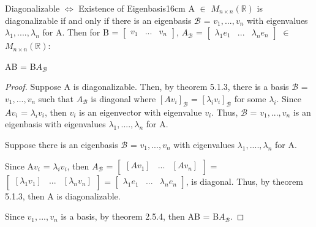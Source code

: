    \vspace{0.5cm}



    \begin{wtheorem}{Diagonalizable $\Leftrightarrow$ Existence of Eigenbasis}{16cm}
        A $\in$ $M_{n \times n}(\mathbb{R})$ is diagonalizable if and only if
        there is an eigenbasis $\mathcal{B}$ = $v_1,...,v_n$ with eigenvalues
        $\lambda_1,....,\lambda_n$ for A.
        Then for B =
        $\begin{bmatrix}
            v_1 & ... & v_n
        \end{bmatrix}$,
        $A_{\mathcal{B}}$ =
        $\begin{bmatrix}
            \lambda_1e_1 & ... & \lambda_ne_n
        \end{bmatrix}$
        $\in$ $M_{n \times n}(\mathbb{R})$:

        \hspace{0.5cm}
        AB = B$A_{\mathcal{B}}$
    \end{wtheorem}

    \begin{proof}
        Suppose A is diagonalizable. Then, by {\color{red} theorem 5.1.3},
        there is a basis $\mathcal{B}$ = $v_1,...,v_n$
        such that $A_{\mathcal{B}}$ is diagonal where
        $[Av_i]_{\mathcal{B}}$ = $[\lambda_i v_i]_{\mathcal{B}}$
        for some $\lambda_i$.
        Since $Av_i$ = $\lambda_i v_i$,
        then $v_i$ is an eigenvector with eigenvalue $v_i$.
        Thus, $\mathcal{B}$ = $v_1,...,v_n$ is an eigenbasis
        with eigenvalues $\lambda_1,....,\lambda_n$ for A.

        \vspace{0.3cm}

        Suppose there is an eigenbasis $\mathcal{B}$ = $v_1,...,v_n$ with
        eigenvalues $\lambda_1,....,\lambda_n$ for A.

        Since A$v_i$ = $\lambda_i v_i$,
        then $A_{\mathcal{B}}$ =
        $\begin{bmatrix}
            [Av_1]_{\mathcal{}} & ... & [Av_n]_{\mathcal{}}
        \end{bmatrix}$ =
        $\begin{bmatrix}
            [\lambda_1v_1]_{\mathcal{}} & ... & [\lambda_nv_n]_{\mathcal{}}
        \end{bmatrix}$ =
        $\begin{bmatrix}
            \lambda_1e_1 & ... & \lambda_ne_n
        \end{bmatrix}$,
        is diagonal.
        Thus, by {\color{red} theorem 5.1.3}, then A is diagonalizable.

        \vspace{0.3cm}

        Since $v_1,...,v_n$ is a basis, by {\color{red} theorem 2.5.4}, then
        AB = B$A_{\mathcal{B}}$.
    \end{proof}

